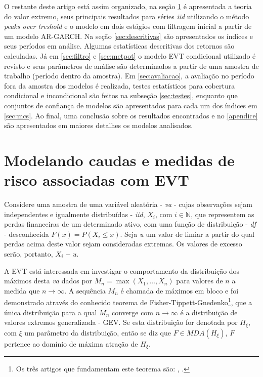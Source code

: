 \documentclass[1p]{elsarticle}
\theoremstyle{definition}
\begin{document}
O restante deste artigo está assim organizado, na seção \ref{sec:caudas} é apresentada a teoria do valor extremo, seus principais resultados para séries \emph{iid} utilizando o método \emph{peaks over treshold} e o modelo em dois estágios com filtragem inicial a partir de um modelo AR-GARCH. Na seção \ref{sec:descritivas} são apresentados os índices e seus períodos em análise. Algumas estatísticas descritivas dos retornos são calculadas. Já em \ref{sec:filtro} e \ref{sec:metpot} o modelo EVT condicional utilizado é revisto e seus parâmetros de análise são determinados a partir de uma amostra de trabalho (período dentro da amostra). Em \ref{sec:avaliacao}, a avaliação no período fora da amostra dos modelos é realizada, testes estatísticos para cobertura condicional e incondicional são feitos na subseção \ref{sec:testes}, enquanto que conjuntos de confiança de modelos são apresentados para cada um dos índices em \ref{sec:mcs}. Ao final, uma conclusão sobre os resultados encontrados e no \ref{apendice} são apresentados em maiores detalhes os modelos analisados.

\section{Modelando caudas e medidas de risco associadas com EVT}
\label{sec:caudas}

Considere uma amostra de uma variável aleatória - \emph{va} - cujas observações sejam independentes e igualmente distribuídas - \emph{iid}, $X_i$, com $i\in \mathbb{N}$, que representem as perdas financeiras de um determinado ativo, com uma função de distribuição - \emph{df} - desconhecida $F(x) = P(X_i \leq x)$.
Seja \emph{u} um valor de limiar a partir do qual perdas acima deste valor sejam consideradas extremas. Os valores de excesso serão, portanto, $X_i - \emph{u}$.

A EVT está interessada em investigar o comportamento da distribuição dos máximos desta \emph{va} dados por $M_n = \max (X_1, \ldots , X_n)$ para valores de $n$ a medida que $n\rightarrow \infty$. A sequência $M_n$ é chamada de máximos em bloco e foi demonstrado através do conhecido teorema de Fisher-Tippett-Gnedenko\footnote{Os três artigos que fundamentam este teorema são: \cite{Fisher1928}, \cite{Gnedenko1941, Gnedenko1943}.}, que a única distribuição para a qual $M_n$ converge com $n\rightarrow \infty$ é a distribuição de valores extremos generalizada - GEV. Se esta distribuição for denotada por $H_\xi$, com $\xi$ um parâmetro da distribuição, então se diz que $F \in MDA(H_\xi)$, $F$ pertence ao domínio de máxima atração de $H_\xi$.
\end{document}
